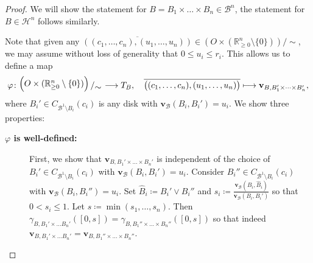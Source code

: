 \documentclass[10pt]{article}
\theoremstyle{definition}
\newcommand{\bigslant}[2]{{\raisebox{.2em}{$#1$}\left/\raisebox{-.2em}{$#2$}\right.}}
\renewcommand{\vec}[1]{\mathbf{#1}}
\begin{document}
\begin{proof}
  We will show the statement for $B=B_1\times\dots\times B_n\in\mathcal B^n$, the statement for $B\in\mathcal H^n$ follows similarly.

  Note that given any $\overline{((c_1,\dots,c_n),(u_1,\dots,u_n))}\in (O\times (\mathbb{R}_{\geq0}^n\setminus\{0\})) / \sim$, we may assume without loss of generality that $0\leq u_i\leq r_i$. This allows us to define a map
  \begin{equation*}
    \varphi\colon \bigslant{\Bigl(O\times (\mathbb{R}_{\geq0}^n\setminus\{0\})\Bigr)}{\sim} \longrightarrow T_B, \quad \overline{\big((c_1,\dots,c_n),(u_1,\dots,u_n)\big)} \longmapsto \vec{v}_{B,B_1'\times\dots\times B_n'},
  \end{equation*}
  where $B_i'\in C_{\mathcal B^1\setminus B_i}(c_i)$ is any disk with $\vec{v}_{\mathcal B}(B_i,B_i')=u_i$.  We show three properties:
  \begin{description}
  \item[\textbf{$\varphi$ is well-defined:}]
    First, we show that $\vec{v}_{B,B_1'\times\dots\times B_n'}$ is independent of the choice of $B_i'\in C_{\mathcal B^1\setminus B_i}(c_i)$ with $\vec{v}_{\mathcal B}(B_i,B_i')=u_i$.  Consider $B_i''\in C_{\mathcal B^1\setminus B_i}(c_i)$ with $\vec{v}_{\mathcal B}(B_i,B_i'')=u_i$. Set $\hat B_i\coloneqq B_i'\vee B_i''$ and $s_i\coloneqq \frac{\vec{v}_{\mathcal B}(B_i,\hat B_i)}{\vec{v}_{\mathcal B}(B_i,B_i')}$ so that $0<s_i\leq 1$.  Let $s\coloneqq\min(s_1,\dots,s_n)$.  Then $\gamma_{B,B_1'\times\dots B_n'}([0,s])=\gamma_{B,B_1''\times \dots \times B_n''}([0,s])$ so that indeed $\vec{v}_{B,B_1'\times\dots B_n'}=\vec{v}_{B,B_1''\times \dots \times B_n''}$.


\end{description}
\end{proof}
\end{document}

